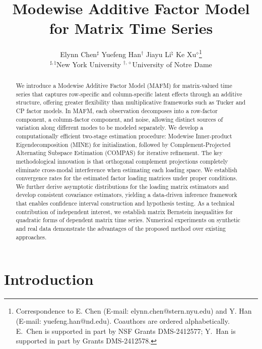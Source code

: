 \documentclass[11pt,letterpaper]{article}
\title{\bf Modewise Additive Factor Model for Matrix Time Series}
\author{Elynn Chen$^\sharp$ \hspace{6ex}
Yuefeng Han$^\dag$ \hspace{6ex}
Jiayu Li$^\natural$ \hspace{6ex} 
Ke Xu$^\diamond$\thanks{\scriptsize{
Correspondence to E. Chen (E-mail: elynn.chen@stern.nyu.edu) and Y. Han (E-mail: yuefeng.han@nd.edu).
Coauthors are ordered alphabetically. E.~Chen is supported in part by NSF Grants DMS-2412577; Y.~Han is supported in part by Grants DMS-2412578.}} \\ \normalsize
\medskip
$^{\sharp,\natural}$New York University \hspace{6ex}
$^{\dag,\diamond}$University of Notre Dame
}
\date{}
\theoremstyle{definition}
\begin{document}
%
%

\maketitle

\begin{abstract}
We introduce a Modewise Additive Factor Model (MAFM) for matrix-valued time series that captures row-specific and column-specific latent effects through an additive structure, offering greater flexibility than multiplicative frameworks such as Tucker and CP factor models. In MAFM, each observation decomposes into a row-factor component, a column-factor component, and noise, allowing distinct sources of variation along different modes to be modeled separately. We develop a computationally efficient two-stage estimation procedure: Modewise Inner-product Eigendecomposition (MINE) for initialization, followed by Complement-Projected Alternating Subspace Estimation (COMPAS) for iterative refinement. The key methodological innovation is that orthogonal complement projections completely eliminate cross-modal interference when estimating each loading space. We establish convergence rates for the estimated factor loading matrices under proper conditions. We further derive asymptotic distributions for the loading matrix estimators and develop consistent covariance estimators, yielding a data-driven inference framework that enables confidence interval construction and hypothesis testing. As a technical contribution of independent interest, we establish matrix Bernstein inequalities for quadratic forms of dependent matrix time series. Numerical experiments on synthetic and real data demonstrate the advantages of the proposed method over existing approaches.
\end{abstract}

%
%


\section{Introduction}  \label{sec:intro}
\end{document}
